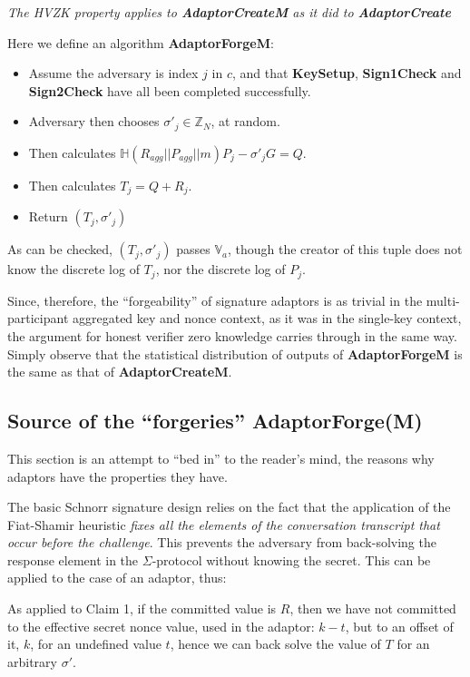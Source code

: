 \documentclass[10pt,a4paper]{article}
\begin{document}
\emph{The HVZK property applies to \textbf{AdaptorCreateM} as it did to \textbf{AdaptorCreate}}

\vspace{10 pt}

Here we define an algorithm \textbf{AdaptorForgeM}:

\begin{itemize}
\item Assume the adversary is index $j$ in $c$, and that \textbf{KeySetup}, \textbf{Sign1Check} and \textbf{Sign2Check} have all been completed successfully.
\item Adversary then chooses $\sigma'_j \in \mathbb{Z}_N$, at random.
\item Then calculates $\mathbb{H}(R_{agg}||P_{agg}||m)P_j - \sigma'_j G = Q$.
\item Then calculates $T_j = Q + R_j$.
\item Return $(T_j, \sigma'_j)$
\end{itemize}

 As can be checked, $(T_j, \sigma'_j)$ passes $\mathbb{V}_a$, though the creator of this tuple does not know the discrete log of $T_j$, nor the discrete log of $P_j$.
 
Since, therefore, the ``forgeability'' of signature adaptors is as trivial in the multi-participant aggregated key and nonce context, as it was in the single-key context, the argument for honest verifier zero knowledge carries through in the same way. Simply observe that the statistical distribution of outputs of \textbf{AdaptorForgeM} is the same as that of \textbf{AdaptorCreateM}.

\subsection{Source of the ``forgeries'' AdaptorForge(M)}

This section is an attempt to ``bed in'' to the reader's mind, the reasons why adaptors have the properties they have.

The basic Schnorr signature design relies on the fact that the application of the Fiat-Shamir heuristic \emph{fixes all the elements of the conversation transcript that occur before the challenge}. This prevents the adversary from back-solving the response element in the $\Sigma$-protocol without knowing the secret. This can be applied to the case of an adaptor, thus:

As applied to Claim 1, if the committed value is $R$, then we have not committed to the effective secret nonce value, used in the adaptor: $k-t$, but to an offset of it, $k$, for an undefined value $t$, hence we can back solve the value of $T$ for an arbitrary $\sigma'$.
\end{document}
